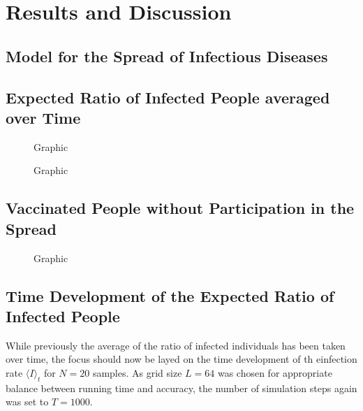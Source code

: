 \section{Results and Discussion}

\subsection{Model for the Spread of Infectious Diseases}

\subsection{Expected Ratio of Infected People averaged over Time}


\begin{figure}[ht]
    \centering
    \resizebox{\textwidth}{!}{}
    \caption{Graphic}\label{fig:Res_Dis_Avg_Inf_over_p1}
\end{figure}


\begin{figure}[ht]
    \centering
    \resizebox{\textwidth}{!}{}
    \caption{Graphic}\label{fig:Res_Dis_Avg_Inf_over_p1_L96}
\end{figure}

\subsection{Vaccinated People without Participation in the Spread}

\begin{figure}[ht]
    \centering
    \resizebox{\textwidth}{!}{}
    \caption{Graphic}\label{fig:Res_Dis_Avg_Inf_over_p4}
\end{figure}

\subsection{Time Development of the Expected Ratio of Infected People}

While previously the average of the ratio of infected individuals has been taken over time, the focus should now be layed on the time development of th einfection rate $\langle I\rangle_t$ for $N=20$ samples.
As grid size $L=64$ was chosen for appropriate balance between running time and accuracy, the number of simulation steps again was set to $T=1000$.